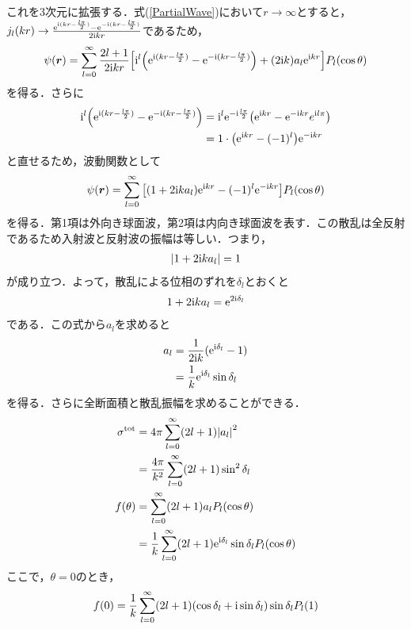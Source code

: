 \documentclass{report}
\begin{document}
  これを3次元に拡張する．式(\ref{PartialWave})において$r\to\infty$とすると，$j_l(kr)\to \frac{\mathrm{e}^{\mathrm{i}(kr - \frac{l\pi}{2})} - \mathrm{e}^{-\mathrm{i}(kr - \frac{l\pi}{2})}}{2\mathrm{i} kr}$であるため，
  \begin{align}
    \psi(\bm{r}) = \sum_{l=0}^{\infty} \frac{2l+1}{2\mathrm{i} kr}\qty[\mathrm{i}^l \qty(\mathrm{e}^{\mathrm{i}(kr - \frac{l\pi}{2})} - \mathrm{e}^{-\mathrm{i}(kr - \frac{l\pi}{2})}) + (2\mathrm{i} k) a_l \mathrm{e}^{\mathrm{i} kr}]P_l(\cos\theta)
  \end{align}
  を得る．さらに
  \begin{align}
    \mathrm{i}^l \qty(\mathrm{e}^{\mathrm{i}(kr - \frac{l\pi}{2})} - \mathrm{e}^{-\mathrm{i}(kr - \frac{l\pi}{2})}) &= \mathrm{i}^l \mathrm{e}^{-\mathrm{i}\frac{l\pi}{2}}\qty(\mathrm{e}^{\mathrm{i} kr} - \mathrm{e}^{-\mathrm{i} kr} e^{\mathrm{i} l\pi})\\
    &= 1\cdot\qty(\mathrm{e}^{\mathrm{i} kr} - (-1)^l) \mathrm{e}^{-\mathrm{i} kr}
  \end{align}
  と直せるため，波動関数として
  \begin{align}
    \label{SCPartialWave}
    \psi(\bm{r}) = \sum_{l=0}^{\infty} \qty[(1 + 2\mathrm{i} ka_l)\mathrm{e}^{\mathrm{i} kr} - (-1)^l \mathrm{e}^{-\mathrm{i} kr}]P_l(\cos\theta)
  \end{align}
  を得る．第1項は外向き球面波，第2項は内向き球面波を表す．この散乱は全反射であるため入射波と反射波の振幅は等しい．つまり，
  \begin{align}
    \abs{1 + 2\mathrm{i} ka_l} = 1
  \end{align}
  が成り立つ．よって，散乱による位相のずれを$\delta_l$とおくと
  \begin{align}
    1 + 2\mathrm{i} ka_l = \mathrm{e}^{2\mathrm{i} \delta_l}
  \end{align}
  である．この式から$a_l$を求めると
  \begin{align}
    a_l &= \frac{1}{2\mathrm{i} k}(\mathrm{e}^{\mathrm{i} \delta_l} - 1)\\
    &= \frac{1}{k}\mathrm{e}^{\mathrm{i} \delta_l} \sin \delta_l
  \end{align}
  を得る．さらに全断面積と散乱振幅を求めることができる．
  \begin{align}
    \sigma^{\mathrm{tot}} &= 4\pi \sum_{l=0}^{\infty} (2l+1)\abs{a_l}^2\\
    &= \frac{4\pi}{k^2} \sum_{l=0}^{\infty} (2l+1)\sin^2\delta_l\\
    f(\theta) &= \sum_{l=0}^{\infty} (2l+1)a_lP_l(\cos\theta)\\
    &= \frac{1}{k} \sum_{l=0}^{\infty}(2l+1)\mathrm{e}^{\mathrm{i}\delta_l}\sin\delta_lP_l(\cos\theta)
  \end{align}
  ここで，$\theta = 0$のとき，
  \begin{align}
    f(0) = \frac{1}{k} \sum_{l=0}^{\infty} (2l+1) (\cos\delta_l + \mathrm{i} \sin\delta_l)\sin\delta_l P_l(1)
  \end{align}
\end{document}
